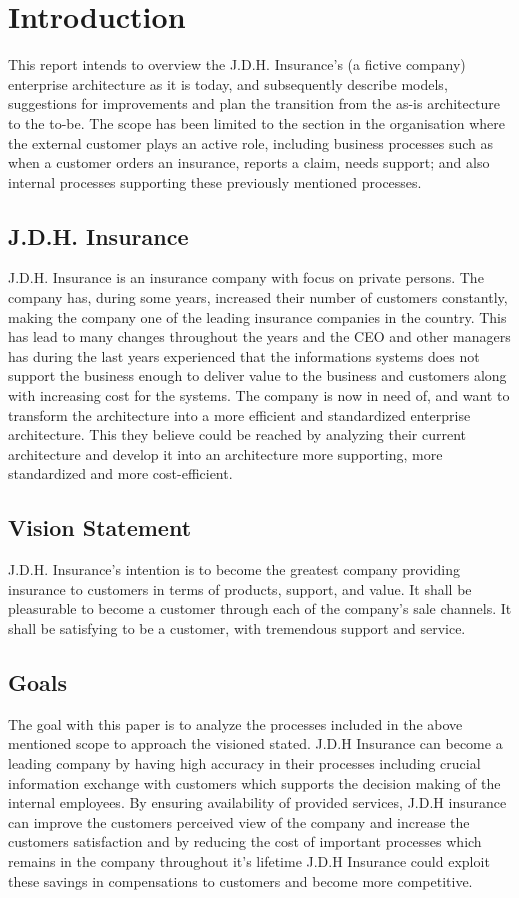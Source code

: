 \section{Introduction}
\label{sec:introduction}
This report intends to overview the J.D.H. Insurance's (a fictive company) enterprise architecture as it is today, and subsequently describe models, suggestions for improvements and plan the transition from the as-is architecture to the to-be. The scope has been limited to the section in the organisation where the external customer plays an active role, including business processes such as when a customer orders an insurance, reports a claim, needs support; and also internal processes supporting these previously mentioned processes.
\subsection{J.D.H. Insurance}
\label{sec:j_d_h_insurance}
J.D.H. Insurance is an insurance company with focus on private persons. The company has, during some years, increased their number of customers constantly, making the company one of the leading insurance companies in the country. This has lead to many changes throughout the years and the CEO and other managers has during the last years experienced that the informations systems does not support the business enough to deliver value to the business and customers along with increasing cost for the systems. The company is now in need of, and want to transform the architecture into a more efficient and standardized enterprise architecture. This they believe could be reached by analyzing their current architecture and develop it into an architecture more supporting, more standardized and more cost-efficient.
\subsection{Vision Statement}
\label{sec:vision_statement}
J.D.H. Insurance's intention is to become the greatest company providing insurance to customers in terms of products, support, and value. It shall be pleasurable to become a customer through each of the company's sale channels. It shall be satisfying to be a customer, with tremendous support and service.
\subsection{Goals}
\label{sec:goals}
The goal with this paper is to analyze the processes included in the above mentioned scope to approach the visioned stated. J.D.H Insurance can become a leading company by having high accuracy in their processes including crucial information exchange with customers which supports the decision making of the internal employees. By ensuring availability of provided services, J.D.H insurance can improve the customers perceived view of the company and increase the customers satisfaction and by reducing the cost of important processes which remains in the company throughout it's lifetime J.D.H Insurance could exploit these savings in compensations to customers and become more competitive.
